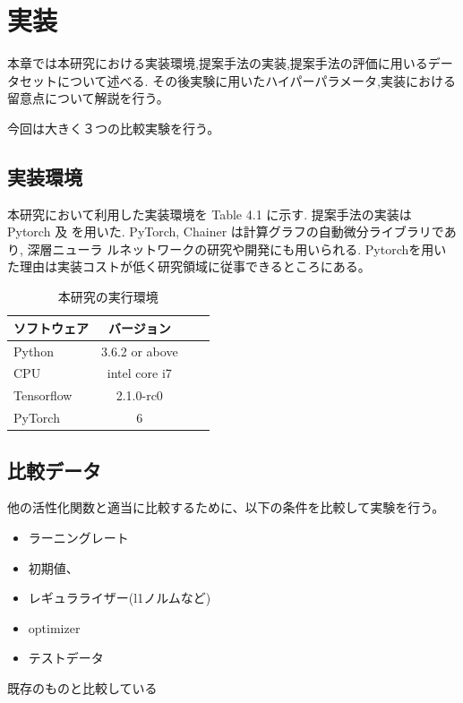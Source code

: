 \chapter{実装}
\label{implementation}

本章では本研究における実装環境,提案手法の実装,提案手法の評価に用いるデータセットについて述べる.
その後実験に用いたハイパーパラメータ,実装における留意点について解説を行う。

今回は大きく３つの比較実験を行う。



\section{実装環境}



本研究において利用した実装環境を Table 4.1 に示す. 提案手法の実装は Pytorch 及
を用いた.  PyTorch, Chainer は計算グラフの自動微分ライブラリであり, 深層ニューラ
ルネットワークの研究や開発にも用いられる.
Pytorchを用いた理由は実装コストが低く研究領域に従事できるところにある。



\begin{table}[htbp]
    \begin{center}
        \caption{本研究の実行環境}
        \begin{tabular}{l*{2}{c}r}
        ソフトウェア              & バージョン \\
        \hline
        Python            & 3.6.2 or above \\
        CPU               & intel core i7 \\
        Tensorflow        & 2.1.0-rc0 \\
        PyTorch           & 6 \\
        \end{tabular}
    \end{center}
\end{table}



\section{比較データ}

他の活性化関数と適当に比較するために、以下の条件を比較して実験を行う。
\begin{itemize}
    \item ラーニングレート
    \item 初期値、
    \item レギュラライザー(l1ノルムなど)
    \item optimizer
    \item テストデータ
\end{itemize}
既存のものと比較している
